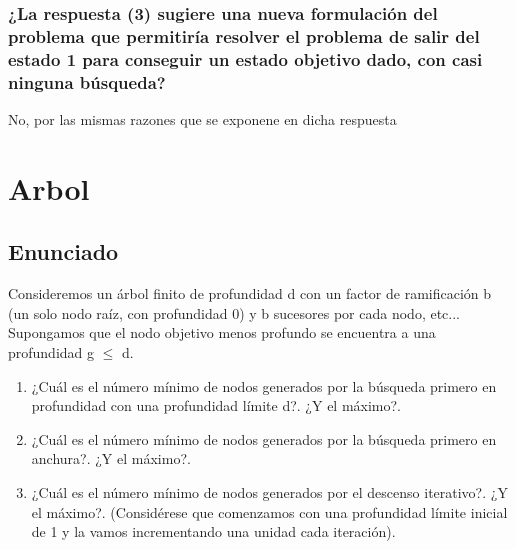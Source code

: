 \documentclass[a4paper,10pt]{article}
\begin{document}
\subsubsection{¿La respuesta (3) sugiere una nueva formulación del problema que permitiría
resolver el problema de salir del estado 1 para conseguir un estado objetivo dado,
con casi ninguna búsqueda?}
No, por las mismas razones que se exponene en dicha respuesta



\section{Arbol}
\subsection{Enunciado}
Consideremos un árbol finito de profundidad d con un factor de ramificación b (un solo nodo raíz, con profundidad 0) y b sucesores por cada nodo, etc... Supongamos que el nodo objetivo menos profundo se encuentra a una profundidad g $\le$ d.
\begin{enumerate}
	\item ¿Cuál es el número mínimo de nodos generados por la búsqueda primero en profundidad con una profundidad límite d?. ¿Y el máximo?.
	\item ¿Cuál es el número mínimo de nodos generados por la búsqueda primero en anchura?.	¿Y el máximo?.
	\item ¿Cuál es el número mínimo de nodos generados por el descenso iterativo?. ¿Y el máximo?. (Considérese que comenzamos con una profundidad límite inicial de 1 y la vamos incrementando una unidad cada iteración).
\end{enumerate}
\end{document}
